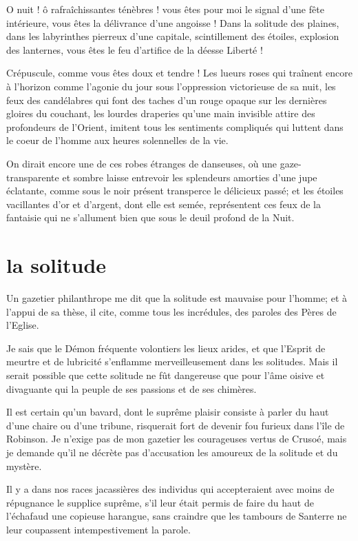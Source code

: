 O nuit ! ô rafraîchissantes ténèbres ! vous êtes pour moi le signal
d’une fête intérieure, vous êtes la délivrance
d’une angoisse ! Dans la solitude des plaines, dans
les labyrinthes pierreux d’une capitale, scintillement
des étoiles, explosion des lanternes, vous êtes le feu
d’artifice de la déesse Liberté !

Crépuscule, comme vous êtes doux et tendre ! Les lueurs roses qui
traînent encore à l’horizon comme
l’agonie du jour sous l’oppression
victorieuse de sa nuit, les feux des candélabres qui font des taches
d’un rouge opaque sur les dernières gloires du
couchant, les lourdes draperies qu’une main invisible
attire des profondeurs de l’Orient, imitent tous les
sentiments compliqués qui luttent dans le coeur de
l’homme aux heures solennelles de la vie.

On dirait encore une de ces robes étranges de danseuses, où une gaze{}-
transparente et sombre laisse entrevoir les splendeurs amorties
d’une jupe éclatante, comme sous le noir présent
transperce le délicieux passé; et les étoiles vacillantes
d’or et d’argent, dont elle est
semée, représentent ces feux de la fantaisie qui ne
s’allument bien que sous le deuil profond de la Nuit.

\quebra\section[La solitude]{la solitude }

Un gazetier philanthrope me dit que la solitude est mauvaise pour
l’homme; et à l’appui de sa thèse, il
cite, comme tous les incrédules, des paroles des Pères de
l’Eglise.

Je sais que le Démon fréquente volontiers les lieux arides, et que
l’Esprit de meurtre et de lubricité
s’enflamme merveilleusement dans les solitudes. Mais
il serait possible que cette solitude ne fût dangereuse que pour
l’âme oisive et divaguante qui la peuple de ses
passions et de ses chimères.

Il est certain qu’un bavard, dont le suprême plaisir
consiste à parler du haut d’une chaire ou
d’une tribune, risquerait fort de devenir fou furieux
dans l’île de Robinson. Je n’exige
pas de mon gazetier les courageuses vertus de Crusoé, mais je demande
qu’il ne décrète pas d’accusation les
amoureux de la solitude et du mystère.

Il y a dans nos races jacassières des individus qui accepteraient avec
moins de répugnance le supplice suprême, s’il leur
était permis de faire du haut de l’échafaud une
copieuse harangue, sans craindre que les tambours de Santerre ne leur
coupassent intempestivement la parole.

